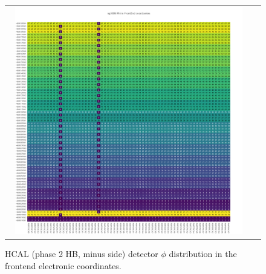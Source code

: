 \clearpage
\begin{figure}[htb]
 \begin{center}
  \begin{tabular}{cc}
   \includegraphics[angle=0,width=0.95\textwidth]{figures/appendix/ngHBM_Phi_in_FrontEnd.png}
  \end{tabular}
  \caption{HCAL (phase 2 HB, minus side) detector $\phi$ distribution in the frontend electronic coordinates.}
  \label{fig:lmapngHBMPhiFEC}
 \end{center}
\end{figure}

